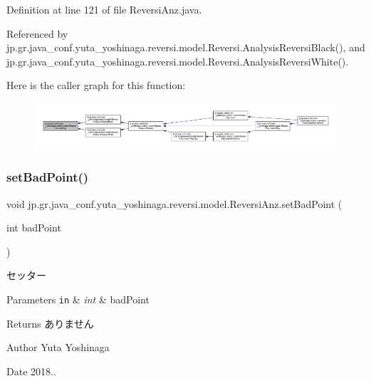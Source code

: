 Definition at line 121 of file Reversi\+Anz.\+java.



Referenced by jp.\+gr.\+java\+\_\+conf.\+yuta\+\_\+yoshinaga.\+reversi.\+model.\+Reversi.\+Analysis\+Reversi\+Black(), and jp.\+gr.\+java\+\_\+conf.\+yuta\+\_\+yoshinaga.\+reversi.\+model.\+Reversi.\+Analysis\+Reversi\+White().

Here is the caller graph for this function\+:
\nopagebreak
\begin{figure}[H]
\begin{center}
\leavevmode
\includegraphics[width=350pt]{classjp_1_1gr_1_1java__conf_1_1yuta__yoshinaga_1_1reversi_1_1model_1_1_reversi_anz_a951e5d9f08cdfeae668b8cd9adaa38ab_icgraph}
\end{center}
\end{figure}
\mbox{\label{classjp_1_1gr_1_1java__conf_1_1yuta__yoshinaga_1_1reversi_1_1model_1_1_reversi_anz_a1e959a8fa487358c94b7615bdb589e30}} 
\subsubsection{\texorpdfstring{set\+Bad\+Point()}{setBadPoint()}}
{\footnotesize\ttfamily void jp.\+gr.\+java\+\_\+conf.\+yuta\+\_\+yoshinaga.\+reversi.\+model.\+Reversi\+Anz.\+set\+Bad\+Point (\begin{DoxyParamCaption}\item[{int}]{bad\+Point }\end{DoxyParamCaption})}



セッター 


\begin{DoxyParams}[1]{Parameters}
\mbox{\tt in}  & {\em int} & bad\+Point \\
\hline
\end{DoxyParams}
\begin{DoxyReturn}{Returns}
ありません 
\end{DoxyReturn}
\begin{DoxyAuthor}{Author}
Yuta Yoshinaga 
\end{DoxyAuthor}
\begin{DoxyDate}{Date}
2018.. 
\end{DoxyDate}


